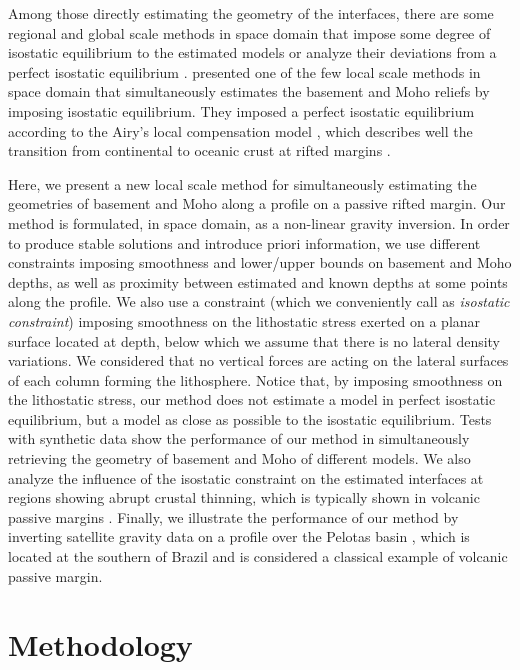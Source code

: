 \documentclass[manuscript]{geophysics}
\begin{document}
Among those directly estimating the geometry of the interfaces, 
there are some regional and global scale methods in space domain that impose 
some degree of isostatic equilibrium to the estimated models 
\citep[e.g.,][]{sunkel1985, sjoberg2009, bagherbandi-eshagh2012, sampietro2015}
or analyze their deviations from a perfect isostatic equilibrium
\citep[e.g.,][]{shin-etal2009}.
\citet{salem-etal2014} presented one of the few local scale 
methods in space domain that simultaneously estimates the basement and Moho
reliefs by imposing isostatic equilibrium. 
They imposed a perfect isostatic equilibrium according to
the Airy's local compensation model \citep{turcotte-schubert2002}, 
which describes well the transition
from continental to oceanic crust at rifted margins 
\citep{worzel1968, watts-moore2017}.

Here, we present a new local scale method for simultaneously estimating the geometries
of basement and Moho along a profile on a passive rifted margin.
Our method is formulated, in space domain, as a non-linear gravity inversion.
In order to produce stable solutions and introduce priori information,
we use different constraints imposing smoothness and lower/upper 
bounds on basement and Moho depths, as well as proximity between estimated 
and known depths at some points along the profile. We also use a constraint
(which we conveniently call as \textit{isostatic constraint}) imposing smoothness
on the lithostatic stress exerted on a planar surface located at depth,
below which we assume that there is no lateral density variations.
We considered that no vertical forces are acting on the lateral surfaces of 
each column forming the lithosphere.
Notice that, by imposing smoothness on the lithostatic stress,
our method does not estimate a model in perfect isostatic equilibrium, 
but a model as close as possible to the isostatic equilibrium.
Tests with synthetic data show the performance of our method in simultaneously
retrieving the geometry of basement and Moho of different models. 
We also analyze the influence of the isostatic constraint on the estimated
interfaces at regions showing abrupt crustal thinning, which is
typically shown in volcanic passive margins \citep{geoffroy2005}.
Finally, we illustrate the performance of our method by inverting 
satellite gravity data on a profile over the Pelotas basin \citep{stica-etal2014}, 
which is located at the southern of Brazil and is considered a classical example 
of volcanic passive margin.


\section{Methodology}
\end{document}
